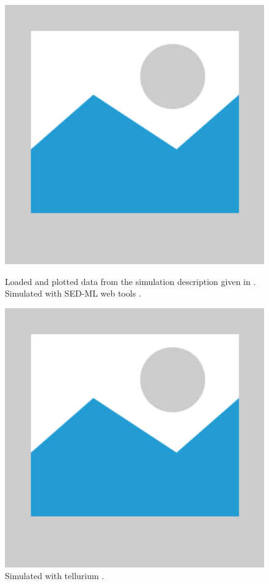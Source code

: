 \begin{figure}[ht]
    \centering
    \begin{minipage}{0.47\textwidth}
        \centering
        \includegraphics[width=1.0\textwidth]{examples/placeholder}
        \caption{Loaded and plotted data from the simulation description given in . Simulated with SED-ML web tools \citep{bergmann2017sed}.}
    \end{minipage}\hfill
    \begin{minipage}{0.47\textwidth}
        \centering
        \includegraphics[width=1.0\textwidth]{examples/placeholder}
        \caption{Simulated with tellurium \citep{tellurium}.}
    \end{minipage}
    \label{fig:reading-data-csv}
\end{figure}

